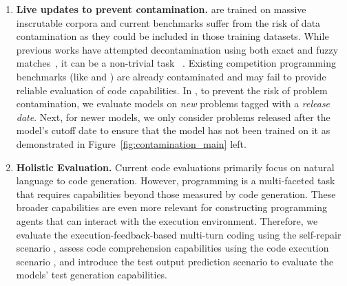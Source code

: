 \begin{enumerate}
\itemsep-0.05em 
    \item \textbf{Live updates to prevent contamination.} 
    \llms{} are trained on massive inscrutable corpora and current benchmarks 
    suffer from the risk of data contamination as they could be included in those training datasets.
While previous works have attempted decontamination using both exact and fuzzy matches~\citep{li2023starcoder, li2023textbooks}, it can be a non-trivial task ~\citep{gemini15,yang2023rethinking}.
        Existing competition programming benchmarks (like \apps{} and \codescope{}) are already contaminated and may fail to provide reliable evaluation of code \llm{} capabilities.
    In \livecodebench{}, to prevent the risk of problem contamination, we evaluate models on \textit{new} problems tagged with a \textit{release date}. 
    Next, for newer models, we only consider problems released after the model's cutoff date to ensure that the model has not been trained on it as demonstrated in Figure~\ref{fig:contamination_main} left.
    
    \item \textbf{Holistic Evaluation.} 
    Current code evaluations primarily focus on natural language to code generation.
    However, programming is a multi-faceted task that requires capabilities beyond those measured by code generation. 
    These broader capabilities are even more relevant for constructing programming agents that can interact with the execution environment.
    Therefore, we evaluate the execution-feedback-based multi-turn coding using the self-repair scenario \citep{olausson2023demystifying}, assess code comprehension capabilities using the code execution scenario \citep{gu2024cruxeval}, and introduce the test output prediction scenario to evaluate the models' test generation capabilities.


\end{enumerate}
